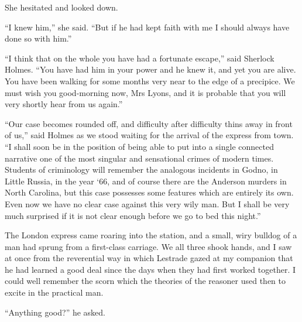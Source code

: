 \documentclass[paper=a5,BCOR=7mm,twoside,DIV=calc,12pt,usegeometry,openany,chapterprefix,endperiod,headings=big]{scrbook} %
\begin{document}
She hesitated and looked down.

\enquote{I knew him,} she said. \enquote{But if he had kept faith with me I should always have done so with him.}

\enquote{I think that on the whole you have had a fortunate escape,} said Sherlock Holmes. \enquote{You have had him in your power and he knew it, and yet you are alive. You have been walking for some months very near to the edge of a precipice. We must wish you good-morning now, Mrs Lyons, and it is probable that you will very shortly hear from us again.}

\enquote{Our case becomes rounded off, and difficulty after difficulty thins away in front of us,} said Holmes as we stood waiting for the arrival of the express from town. \enquote{I shall soon be in the position of being able to put into a single connected narrative one of the most singular and sensational crimes of modern times. Students of criminology will remember the analogous incidents in Godno, in Little Russia, in the year `66, and of course there are the Anderson murders in North Carolina, but this case possesses some features which are entirely its own. Even now we have no clear case against this very wily man. But I shall be very much surprised if it is not clear enough before we go to bed this night.}

The London express came roaring into the station, and a small, wiry bulldog of a man had sprung from a first-class carriage. We all three shook hands, and I saw at once from the reverential way in which Lestrade gazed at my companion that he had learned a good deal since the days when they had first worked together. I could well remember the scorn which the theories of the reasoner used then to excite in the practical man.


\enquote{Anything good?} he asked.
\end{document}

